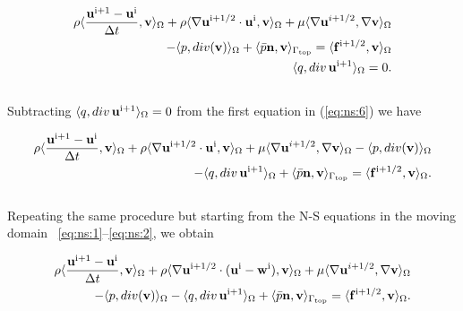 \documentclass[a4paper,11pt,oneside]{book}
\begin{document}
\begin{equation}
\label{eq:ns:6}
\begin{split}
\rho \langle \frac{\mathbf{u}^{\rm i+1} - \mathbf{u}^{\rm i}}{\Delta t}, \mathbf{v} \rangle_\Omega
+ \rho \langle \nabla \mathbf{u}^{\rm i+1/2} \cdot \mathbf{u}^{\rm i}, \mathbf{v} \rangle_\Omega
+ \mu \langle \nabla \mathbf{u}^{i+1/2} , \nabla \mathbf{v} \rangle_\Omega \\
- \langle p , div(\mathbf{v}) \rangle_\Omega 
+ \langle \bar{p} \mathbf{n}, \mathbf{v} \rangle_{\Gamma_{\rm top}}
= \langle \mathbf{f}^{\rm i + 1/2}, \mathbf{v} \rangle_\Omega \\
\langle q , div \, \mathbf{u}^{\rm i+1} \rangle_\Omega = 0.
\end{split}
\end{equation}
\\
Subtracting $\langle q , div \, \mathbf{u}^{\rm i+1} \rangle_\Omega = 0$ from the first equation in (\ref{eq:ns:6}) we have

\begin{equation}
\begin{split}
\rho \langle \frac{\mathbf{u}^{\rm i+1} - \mathbf{u}^{\rm i}}{\Delta t}, \mathbf{v} \rangle_\Omega
+ \rho \langle \nabla \mathbf{u}^{\rm i+1/2} \cdot \mathbf{u}^{\rm i}, \mathbf{v} \rangle_\Omega
+ \mu \langle \nabla \mathbf{u}^{i+1/2} , \nabla \mathbf{v} \rangle_\Omega
- \langle p , div(\mathbf{v}) \rangle_\Omega \\
- \langle q , div \, \mathbf{u}^{\rm i+1} \rangle_\Omega 
+ \langle \bar{p} \mathbf{n}, \mathbf{v} \rangle_{\Gamma_{\rm top}}
= \langle \mathbf{f}^{\rm i + 1/2}, \mathbf{v} \rangle_\Omega.
\end{split}
\end{equation}
\\
Repeating the same procedure but starting from the N-S equations in the moving domain ~\eqref{eq:ns:1}--\eqref{eq:ns:2}, we obtain

\begin{equation}
\begin{split}
\rho \langle \frac{\mathbf{u}^{\rm i+1} - \mathbf{u}^{\rm i}}{\Delta t}, \mathbf{v} \rangle_\Omega
+ \rho \langle \nabla \mathbf{u}^{\rm i+1/2} \cdot (\mathbf{u}^{\rm i} - \mathbf{w}^{\rm i}), \mathbf{v} \rangle_\Omega
+ \mu \langle \nabla \mathbf{u}^{i+1/2} , \nabla \mathbf{v} \rangle_\Omega \\
- \langle p , div(\mathbf{v}) \rangle_\Omega
- \langle q , div \, \mathbf{u}^{\rm i+1} \rangle_\Omega 
+ \langle \bar{p} \mathbf{n}, \mathbf{v} \rangle_{\Gamma_{\rm top}}
= \langle \mathbf{f}^{\rm i + 1/2}, \mathbf{v} \rangle_\Omega.
\end{split}
\end{equation}
\end{document}
